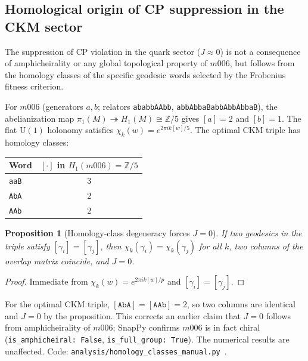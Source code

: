 \documentclass[11pt,a4paper]{article}
\newtheorem{proposition}{Proposition}
\begin{document}
\subsection{Homological origin of CP suppression in the CKM sector}
\label{subsec:homological_cp}

The suppression of CP violation in the quark sector ($J \approx 0$) is not
a consequence of amphicheirality or any global topological property of $m006$,
but follows from the homology classes of the specific geodesic words
selected by the Frobenius fitness criterion.

For $m006$ (generators $a,b$; relators \texttt{ababbAAbb},
\texttt{abbAbbaBabbAbbAbbaB}), the abelianization map
$\pi_1(M) \twoheadrightarrow H_1(M) \cong \mathbb{Z}/5$
gives $[a] = 2$ and $[b] = 1$.
The flat $\mathrm{U}(1)$ holonomy satisfies
$\chi_k(w) = e^{2\pi i k [w]/5}$.
The optimal CKM triple has homology classes:
\begin{center}\small
\begin{tabular}{lc}
\toprule
Word & $[\cdot]$ in $H_1(m006)=\mathbb{Z}/5$ \\
\midrule
\texttt{aaB} & $3$ \\
\texttt{AbA} & $2$ \\
\texttt{AAb} & $2$ \\
\bottomrule
\end{tabular}
\end{center}

\begin{proposition}[Homology-class degeneracy forces $J=0$]
\label{prop:hom_class}
If two geodesics in the triple satisfy $[\gamma_i] = [\gamma_j]$,
then $\chi_k(\gamma_i) = \chi_k(\gamma_j)$ for all $k$,
two columns of the overlap matrix coincide, and $J = 0$.
\end{proposition}

\begin{proof}
Immediate from $\chi_k(w) = e^{2\pi ik[w]/p}$ and $[\gamma_i]=[\gamma_j]$.
\end{proof}

For the optimal CKM triple, $[\texttt{AbA}] = [\texttt{AAb}] = 2$,
so two columns are identical and $J = 0$ by the proposition.
This corrects an earlier claim that $J = 0$ follows from
amphicheirality of $m006$; SnapPy confirms $m006$ is in fact
chiral (\texttt{is\_amphicheiral: False}, \texttt{is\_full\_group: True}).
The numerical results are unaffected.
Code: \texttt{analysis/homology\_classes\_manual.py}~\cite{Gentry:Scan}.
\end{document}
